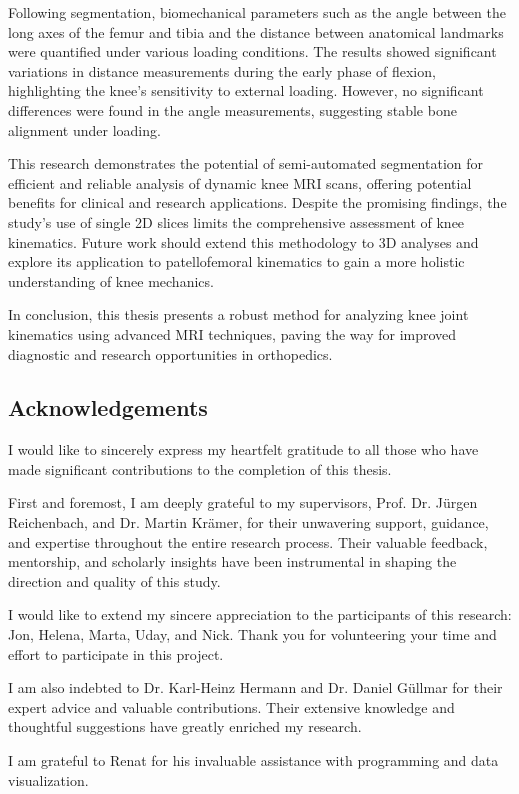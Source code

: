 \documentclass{micro-econ-thesis}
\begin{document}
Following segmentation, biomechanical parameters such as the angle between the long axes of the femur and tibia and the distance between anatomical landmarks were quantified under various loading conditions. The results showed significant variations in distance measurements during the early phase of flexion, highlighting the knee's sensitivity to external loading. However, no significant differences were found in the angle measurements, suggesting stable bone alignment under loading.

This research demonstrates the potential of semi-automated segmentation for efficient and reliable analysis of dynamic knee MRI scans, offering potential benefits for clinical and research applications. Despite the promising findings, the study's use of single 2D slices limits the comprehensive assessment of knee kinematics. Future work should extend this methodology to 3D analyses and explore its application to patellofemoral kinematics to gain a more holistic understanding of knee mechanics.

In conclusion, this thesis presents a robust method for analyzing knee joint kinematics using advanced MRI techniques, paving the way for improved diagnostic and research opportunities in orthopedics.

\clearpage
\subsection*{Acknowledgements}
I would like to sincerely express my heartfelt gratitude to all those who have made significant contributions to the completion of this thesis.

First and foremost, I am deeply grateful to my supervisors, Prof. Dr. Jürgen Reichenbach, and Dr. Martin Krämer, for their unwavering support, guidance, and expertise throughout the entire research process. Their valuable feedback, mentorship, and scholarly insights have been instrumental in shaping the direction and quality of this study.


I would like to extend my sincere appreciation to the participants of this research: Jon, Helena, Marta, Uday, and Nick. Thank you for volunteering your time and effort to participate in this project.
 
 
I am also indebted to Dr. Karl-Heinz Hermann and Dr. Daniel Güllmar for their expert advice and valuable contributions. Their extensive knowledge and thoughtful suggestions have greatly enriched my research.


I am grateful to Renat for his invaluable assistance with programming and data visualization.
\end{document}
